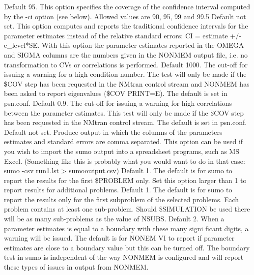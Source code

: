 \begin{optionlist}
Default 95. This option specifies the coverage of the confidence interval computed by the -ci option (see below). Allowed values are 90, 95, 99 and 99.5 
\nextopt
{}
Default not set. This option computes and reports the traditional confidence intervals for the parameter estimates instead of the relative standard errors: CI = estimate +/- c\_level*SE. With this option the parameter estimates reported in the OMEGA and SIGMA columns are the numbers given in the NONMEM output file, i.e. no transformation to CVs or correlations is performed. 
\nextopt
{}
Default 1000. The cut-off for issuing a warning for a high condition number. The test will only be made if the \$COV step has been requested in the NMtran control stream and NONMEM has been asked to report eigenvalues (\$COV PRINT=E). The default is set in psn.conf. 
\nextopt
{}
Default 0.9. The cut-off for issuing a warning for high correlations between the parameter estimates. This test will only be made if the \$COV step has been requested in the NMtran control stream. The default is set in psn.conf. 
\nextopt
{}
Default not set. Produce output in which the columns of the parameters estimates and standard errors are comma separated. This option can be used if you wish to import the sumo output into a spreadsheet programs, such as MS Excel. (Something like this is probably what you would want to do in that case: sumo -csv run1.lst > sumooutput.csv) 
\nextopt
{}
Default 1. The default is for sumo to report the results for the first \$PROBLEM only. Set this option larger than 1 to report results for additional problems. 
\nextopt
{}
Default 1. The default is for sumo to report the results only for the first subproblem of the selected problems. Each problem contains at least one sub-problem. Should \$SIMULATION be used there will be as many sub-problems as the value of NSUBS. 
\nextopt
{}
Default 2. When a parameter estimates is equal to a boundary with these many signi ficant digits, a warning will be issued. The default is for NONEM VI to report if parameter estimates are close to a boundary value but this can be turned off. The boundary test in sumo is independent of the way NONMEM is configured and will report these types of issues in output from NONMEM. 
\nextopt
{}

\end{optionlist}
